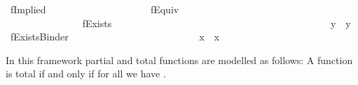 \begin{isabellebody}
\isamarkupfalse%
\ fImplied\ {\isacharparenleft}\ {\isachardoublequoteopen}\isactrlbold {\isasymleftarrow}{\isachardoublequoteclose}\ {}{}{\isacharparenright}\ \ \ \ \ \ \ \isanewline
\ \ {\isachardoublequoteopen}{\isasymphi}\ \isactrlbold {\isasymleftarrow}\ {\isasympsi}\ {\isasymequiv}\ {\isasympsi}\ \isactrlbold {\isasymrightarrow}\ {\isasymphi}{\isachardoublequoteclose}\ \isanewline
{}\isamarkupfalse%
\ fEquiv\ {\isacharparenleft}\ {\isachardoublequoteopen}\isactrlbold {\isasymleftrightarrow}{\isachardoublequoteclose}\ {}{}{\isacharparenright}\ \ \ \ \ \ \ \ \ \ \ \ \ \ \ \ \ \ \ \ \ \ \ \ \ \ \ \ \ \isanewline
\ \ {\isachardoublequoteopen}{\isasymphi}\ \isactrlbold {\isasymleftrightarrow}\ {\isasympsi}\ {\isasymequiv}\ {\isacharparenleft}{\isasymphi}\ \isactrlbold {\isasymrightarrow}\ {\isasympsi}{\isacharparenright}\ \isactrlbold {\isasymand}\ {\isacharparenleft}{\isasympsi}\ \isactrlbold {\isasymrightarrow}\ {\isasymphi}{\isacharparenright}{\isachardoublequoteclose}\ \ \isanewline
{}\isamarkupfalse%
\ fExists\ {\isacharparenleft}{\isachardoublequoteopen}\isactrlbold {\isasymexists}{\isachardoublequoteclose}{\isacharparenright}\ \ \ \ \ \ \ \ \ \ \ \ \ \ \ \ \ \ \ \ \ \ \ \ \ \ \ \ \ \ \ \ \ \ \ \ \ \ \ \isanewline
\ \ {\isachardoublequoteopen}\isactrlbold {\isasymexists}{\isasymPhi}\ {\isasymequiv}\ \isactrlbold {\isasymnot}{\isacharparenleft}\isactrlbold {\isasymforall}{\isacharparenleft}{\isasymlambda}y{\isachardot}\ \isactrlbold {\isasymnot}{\isacharparenleft}{\isasymPhi}\ y{\isacharparenright}{\isacharparenright}{\isacharparenright}{\isachardoublequoteclose}\isanewline
{}\isamarkupfalse%
\ fExistsBinder\ {\isacharparenleft}\ {\isachardoublequoteopen}\isactrlbold {\isasymexists}{\isachardoublequoteclose}\ {\isacharbrackleft}{}{\isacharbrackright}{}{\isacharparenright}\ \ \ \ \ \ \ \ \ \ \ \ \ \ \ \ \ \ \ \ \ \isanewline
\ \ {\isachardoublequoteopen}\isactrlbold {\isasymexists}x{\isachardot}\ {\isasymphi}\ x\ {\isasymequiv}\ \isactrlbold {\isasymexists}{\isasymphi}{\isachardoublequoteclose}%
\begin{isamarkuptext}%
In this framework partial and total functions are modelled as follows: 
A function  is total if and only if for all  we have . 

\end{isamarkuptext}
\end{isabellebody}
